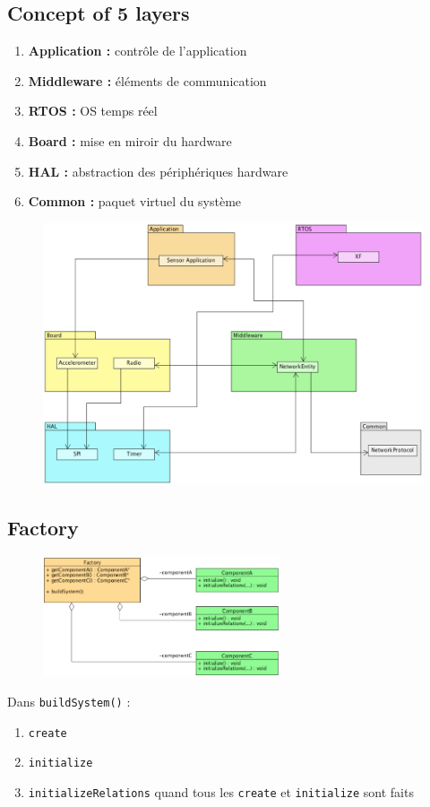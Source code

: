 \subsection{Concept of 5 layers}
\begin{enumerate}
    \item \textbf{Application :} contrôle de l'application
    \item \textbf{Middleware :} éléments de communication
    \item \textbf{RTOS :} OS temps réel
    \item \textbf{Board :} mise en miroir du hardware
    \item \textbf{HAL :} abstraction des périphériques hardware
    \item \textbf{Common :} paquet virtuel du système
\end{enumerate}
\begin{figure}[H]
    \centering
    \includegraphics[width=0.8\linewidth]{figures/5_layers.png}
\end{figure}
%
\subsection{Factory}
\begin{figure}[H]
    \centering
    \includegraphics[width=7.00cm]{figures/factory.png}
\end{figure}
Dans \verb+buildSystem()+ :
\begin{enumerate}
    \item \verb!create!
    \item \verb!initialize!
    \item \verb!initializeRelations! quand tous les \verb!create! et \verb!initialize! sont faits
\end{enumerate}
%
